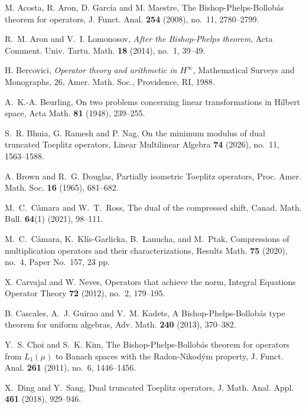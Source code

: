 \documentclass[12pt]{amsart}
\theoremstyle{definition}
\theoremstyle{remark}
\numberwithin{equation}{section}
\begin{document}
	
	
	
	
	
	
	
\begin{thebibliography}{}
 M. Acosta, R. Aron, D. Garc\'{i}a and M. Maestre, The Bishop-Phelps-Bollob\'{a}s theorem for operators, J. Funct. Anal. {\bf 254} (2008), no.~11, 2780–2799.

 R.~M. Aron and V.~I. Lomonosov, {\it After the Bishop-Phelps theorem}, Acta Comment. Univ. Tartu. Math. {\bf 18} (2014), no.~1, 39--49.
    
H. Bercovici, {\it Operator theory and arithmetic in $H^\infty$}, Mathematical Surveys and Monographs, 26, Amer. Math. Soc., Providence, RI, 1988. 

A.~K.-A. Beurling, On two problems concerning linear transformations in Hilbert space, Acta Math. {\bf 81} (1948), 239--255.


S.~R. Bhuia, G. Ramesh and P. Nag, On the minimum modulus of dual truncated Toeplitz operators, Linear Multilinear Algebra {\bf 74} (2026), no.~11, 1563--1588.


A. Brown and R.~G. Douglas, Partially isometric Toeplitz operators, Proc. Amer. Math. Soc. {\bf 16} (1965), 681--682.

M.~C.~C\^amara and W.~T.~Ross, The dual of the compressed shift, Canad. Math. Bull. \textbf{64}(1) (2021), 98--111.

 M.~C.~C\^amara, K.~Kl\'is-Garlicka, B.~\L anucha, and M.~Ptak, Compressions of multiplication operators and their characterizations, Results Math. \textbf{75} (2020), no.~4, Paper No.~157, 23 pp.

X. Carvajal and W. Neves, Operators that achieve the norm, Integral Equations Operator Theory {\bf 72} (2012), no.~2, 179--195.

B. Cascales, A.~J. Guirao and V.~M. Kadets, A Bishop-Phelps-Bollob\'as type theorem for uniform algebras, Adv. Math. {\bf 240} (2013), 370--382.

Y.~S. Choi and S.~K. Kim, The Bishop-Phelps-Bollob\'as theorem for operators from $L_1(\mu)$ to Banach spaces with the Radon-Nikod\'ym property, J. Funct. Anal. {\bf 261} (2011), no.~6, 1446--1456.
    
    
 X.~Ding and Y.~Sang, Dual truncated Toeplitz operators, J. Math. Anal. Appl. \textbf{461} (2018), 929--946.


\end{thebibliography}
\end{document}

